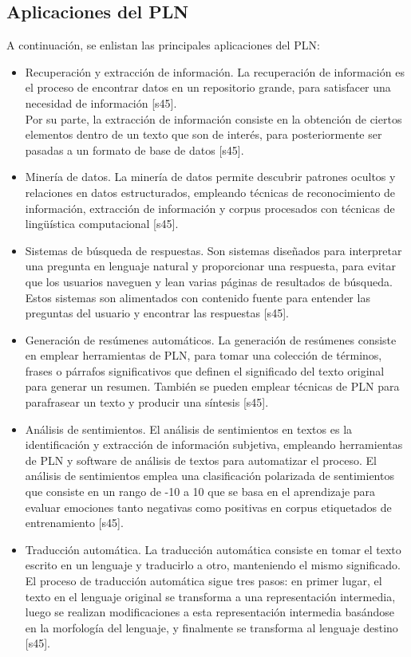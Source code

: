 \subsection{Aplicaciones del PLN}
A continuación, se enlistan las principales aplicaciones del PLN:
\begin{itemize}
    \item Recuperación y extracción de información. La recuperación de información es el proceso de encontrar datos en un repositorio grande, para satisfacer una necesidad de información [s45].\\ 
    Por su parte, la extracción de información consiste en la obtención de ciertos elementos dentro de un texto que son de interés, para posteriormente ser pasadas a un formato de base de datos [s45].    
    \item Minería de datos. La minería de datos permite descubrir patrones ocultos y relaciones en datos estructurados, empleando técnicas de reconocimiento de información, extracción de información y corpus procesados con técnicas de lingüística computacional [s45].
    \item Sistemas de búsqueda de respuestas. Son sistemas diseñados para interpretar una pregunta en lenguaje natural y proporcionar una respuesta, para evitar que los usuarios naveguen y lean varias páginas de resultados de búsqueda. Estos sistemas son alimentados con contenido fuente para entender las preguntas del usuario y encontrar las respuestas [s45].
    \item Generación de resúmenes automáticos. La generación de resúmenes consiste en emplear herramientas de PLN, para tomar una colección de términos, frases o párrafos significativos que definen el significado del texto original para generar un resumen. También se pueden emplear técnicas de PLN para parafrasear un texto y producir una síntesis [s45].
    \item Análisis de sentimientos. El análisis de sentimientos en textos es la identificación y extracción de información subjetiva, empleando herramientas de PLN y software de análisis de textos para automatizar el proceso. El análisis de sentimientos emplea una clasificación polarizada de sentimientos que consiste en un rango de -10 a 10 que se basa en el aprendizaje para evaluar emociones tanto negativas como positivas en corpus etiquetados de entrenamiento [s45].
    \item Traducción automática. La traducción automática consiste en tomar el texto escrito en un lenguaje y traducirlo a otro, manteniendo el mismo significado. El proceso de traducción automática sigue tres pasos: en primer lugar, el texto en el lenguaje original se transforma a una representación intermedia, luego se realizan modificaciones a esta representación intermedia basándose en la morfología del lenguaje, y finalmente se transforma al lenguaje destino [s45].
\end{itemize}


